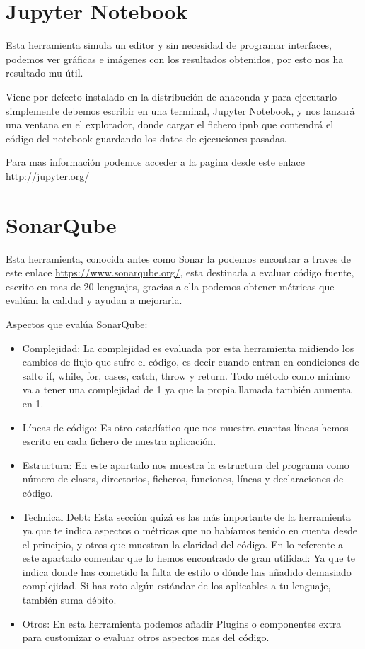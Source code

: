 \section{Jupyter Notebook}
\label{notebook:jupiter}

Esta herramienta simula un editor y sin necesidad de programar interfaces, podemos ver gráficas e imágenes con los resultados obtenidos, por esto nos ha resultado mu útil.

Viene por defecto instalado en la distribución de anaconda y para ejecutarlo simplemente debemos escribir en una terminal, Jupyter Notebook, y nos lanzará una ventana en el explorador, donde cargar el fichero ipnb que contendrá el código del notebook guardando los datos de ejecuciones pasadas.


Para mas información podemos acceder a la pagina desde este enlace \url{http://jupyter.org/}

\section{SonarQube}
Esta herramienta, conocida antes como Sonar la podemos encontrar a traves de este enlace \url{https://www.sonarqube.org/}, esta destinada a evaluar código fuente, escrito en mas de 20 lenguajes, gracias a ella podemos obtener métricas que evalúan la calidad y ayudan a mejorarla.

Aspectos que evalúa SonarQube:
\begin{itemize}
	\item Complejidad: La complejidad es evaluada por esta herramienta midiendo los cambios de flujo que sufre el código, es decir cuando entran en condiciones de salto if, while, for, cases, catch, throw y return. Todo método como mínimo va a tener una complejidad de 1 ya que la propia llamada también aumenta en 1.
	\item Líneas de código: Es otro estadístico que nos muestra cuantas líneas hemos escrito en cada fichero de nuestra aplicación.
	\item Estructura: En este apartado nos muestra la estructura del programa como número de clases, directorios, ficheros, funciones, líneas y declaraciones de código.
	\item Technical Debt: Esta sección quizá es las más importante de la herramienta ya que te indica aspectos o métricas que no habíamos tenido en cuenta desde el principio, y otros que muestran la claridad del código.
	En lo referente a este apartado comentar que lo hemos encontrado de gran utilidad: Ya que te indica donde has cometido la falta de estilo o dónde has añadido demasiado complejidad. 
Si has roto algún estándar de los aplicables a tu lenguaje, también suma débito.
	\item Otros: En esta herramienta podemos añadir Plugins o componentes extra para customizar o evaluar otros aspectos mas del código.
\end{itemize}